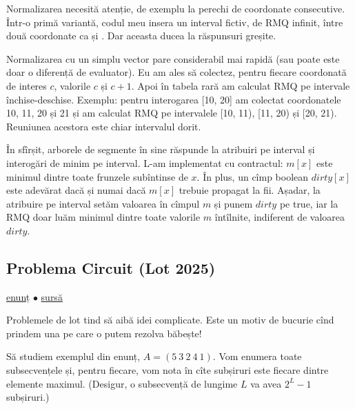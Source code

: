\documentclass[../main.tex]{subfiles}
\begin{document}
Normalizarea necesită atenție, de exemplu la perechi de coordonate consecutive. Într-o primă variantă, codul meu insera un interval fictiv, de RMQ infinit, între două coordonate ca  și . Dar aceasta ducea la răspunsuri greșite.

Normalizarea cu un simplu vector pare considerabil mai rapidă (sau poate este doar o diferență de evaluator). Eu am ales să colectez, pentru fiecare coordonată de interes $c$, valorile $c$ și $c+1$. Apoi în tabela rară am calculat RMQ pe intervale închise-deschise. Exemplu: pentru interogarea [10, 20] am colectat coordonatele 10, 11, 20 și 21 și am calculat RMQ pe intervalele [10, 11), [11, 20) și [20, 21). Reuniunea acestora este chiar intervalul dorit.

În sfîrșit, arborele de segmente în sine răspunde la atribuiri pe interval și interogări de minim pe interval. L-am implementat cu contractul: $m[x]$ este minimul dintre toate frunzele subîntinse de $x$. În plus, un cîmp boolean $dirty[x]$ este adevărat dacă și numai dacă $m[x]$ trebuie propagat la fii. Așadar, la atribuire pe interval setăm valoarea în cîmpul $m$ și punem $dirty$ pe true, iar la RMQ doar luăm minimul dintre toate valorile $m$ întîlnite, indiferent de valoarea $dirty$.

\subsection{Problema Circuit (Lot 2025)}
\label{problem:circuit}

\href{https://kilonova.ro/problems/3806}{enunț}
$\bullet$
\hyperref[code:circuit]{sursă}

Problemele de lot tind să aibă idei complicate. Este un motiv de bucurie cînd prindem una pe care o putem rezolva băbește!

Să studiem exemplul din enunț, $A = (5\ 3\ 2\ 4\ 1)$. Vom enumera toate subsecvențele și, pentru fiecare, vom nota în cîte subșiruri este fiecare dintre elemente maximul. (Desigur, o subsecvență de lungime $L$ va avea $2^L - 1$ subșiruri.)
\end{document}
